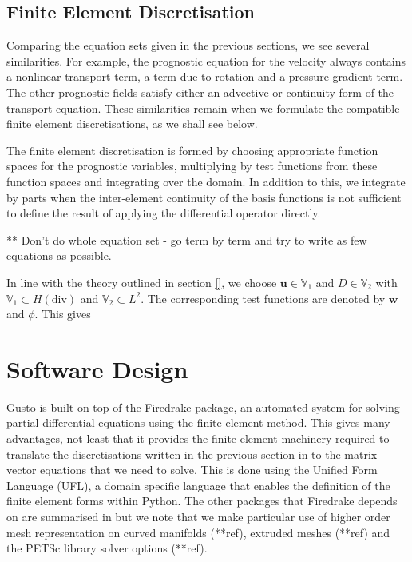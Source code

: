 \documentclass[11pt, a4paper]{article}
\def\MM#1{\boldsymbol{#1}}
\begin{document}
\subsection{Finite Element Discretisation}
\label{sec: FEM}

Comparing the equation sets given in the previous sections, we see
several similarities. For example, the prognostic equation for the
velocity always contains a nonlinear transport term, a term due to
rotation and a pressure gradient term. The other prognostic fields
satisfy either an advective or continuity form of the transport
equation. These similarities remain when we formulate the compatible
finite element discretisations, as we shall see below.

The finite element discretisation is formed by choosing appropriate
function spaces for the prognostic variables, multiplying by test
functions from these function spaces and integrating over the
domain. In addition to this, we integrate by parts when the
inter-element continuity of the basis functions is not sufficient to
define the result of applying the differential operator directly.

** Don't do whole equation set - go term by term and try to write as
few equations as possible.

In line with the theory outlined in section \ref{}, we
choose $\MM{u} \in \mathbb{V}_1$ and $D \in \mathbb{V}_2$ with
$\mathbb{V}_1 \subset H(\text{div})$ and $\mathbb{V}_2 \subset L^2$. The
corresponding test functions are denoted by $\MM{w}$ and $\phi$. This gives



\section{Software Design}
\label{sec: design}
Gusto is built on top of the Firedrake package, an automated system
for solving partial differential equations using the finite element
method. This gives many advantages, not least that it provides the
finite element machinery required to translate the discretisations
written in the previous section in to the matrix-vector equations that
we need to solve. This is done using the Unified Form Language (UFL),
a domain specific language that enables the definition of the finite
element forms within Python. The other packages that Firedrake depends
on are summarised in \citet{davies2022towards} but we note that we
make particular use of higher order mesh representation on curved
manifolds (**ref), extruded meshes (**ref) and the PETSc library
solver options (**ref).
\end{document}
